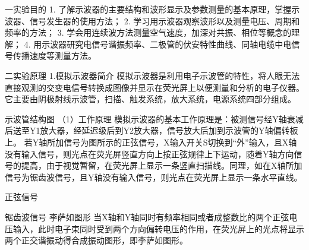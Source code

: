 一实验目的
1. 了解示波器的主要结构和波形显示及参数测量的基本原理，掌握示波器、信号发生器的使用方法；
2. 学习用示波器观察波形以及测量电压、周期和频率的方法；
3. 学会用连续波方法测量空气速度，加深对共振、相位等概念的理解；
4. 用示波器研究电信号谐振频率、二极管的伏安特性曲线、同轴电缆中电信号传播速度等测量方法。

二实验原理
1.模拟示波器简介
模拟示波器是利用电子示波管的特性，将人眼无法直接观测的交变电信号转换成图像并显示在荧光屏上以便测量和分析的电子仪器。它主要由阴极射线示波管，扫描、触发系统，放大系统，电源系统四部分组成。

示波管结构图
（1）工作原理
模拟示波器的基本工作原理是：被测信号经Y轴衰减后送至Y1放大器，经延迟级后到Y2放大器，信号放大后加到示波管的Y轴偏转板上。
若Y轴所加信号为图所示的正弦信号，X输入开关S切换到“外”输入，且X轴没有输入信号，则光点在荧光屏竖直方向上按正弦规律上下运动，随着Y轴方向信号的提高，由于视觉暂留，在荧光屏上显示一条竖直扫描线。同理，如在X轴所加信号为锯齿波信号，且Y轴没有输入信号，则光点在荧光屏上显示一条水平直线。

正弦信号

锯齿波信号
李萨如图形
当X轴和Y轴同时有频率相同或者成整数比的两个正弦电压输入，此时电子束同时受到两个方向偏转电压的作用，在荧光屏上的光点将显示两个正交谐振动得合成振动图形，即李萨如图形。

